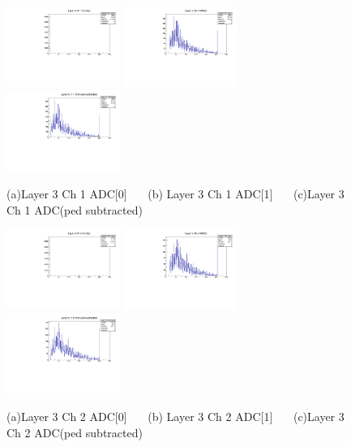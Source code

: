 \documentclass[a4paper,11pt]{article}
\theoremstyle{mytheor}
\begin{document}
\begin{figure}[H] 
\vspace*{-0.3cm} 
\includegraphics[width=0.33\textwidth,scale=0.5,trim=0 0 0 0,clip]{plotsdir/file0_muons-Layer3_Ch1_adc0-1.pdf} 
\includegraphics[width=0.33\textwidth,scale=0.5,trim=0 0 0 0,clip]{plotsdir/file0_muons-Layer3_Ch1_adc1-1.pdf} 
\includegraphics[width=0.33\textwidth,scale=0.5,trim=0 0 0 0,clip]{plotsdir/file0_muons-Layer3_Ch1_adcPedsub-1.pdf} 
\caption{(a)Layer 3 Ch 1 ADC[0] ~~~(b) Layer 3 Ch 1 ADC[1] ~~~(c)Layer 3 Ch 1 ADC(ped subtracted) } 
\end{figure} 
\begin{figure}[H] 
\vspace*{-0.3cm} 
\includegraphics[width=0.33\textwidth,scale=0.5,trim=0 0 0 0,clip]{plotsdir/file0_muons-Layer3_Ch2_adc0-1.pdf} 
\includegraphics[width=0.33\textwidth,scale=0.5,trim=0 0 0 0,clip]{plotsdir/file0_muons-Layer3_Ch2_adc1-1.pdf} 
\includegraphics[width=0.33\textwidth,scale=0.5,trim=0 0 0 0,clip]{plotsdir/file0_muons-Layer3_Ch2_adcPedsub-1.pdf} 
\caption{(a)Layer 3 Ch 2 ADC[0] ~~~(b) Layer 3 Ch 2 ADC[1] ~~~(c)Layer 3 Ch 2 ADC(ped subtracted) } 
\end{figure} 
\end{document}
